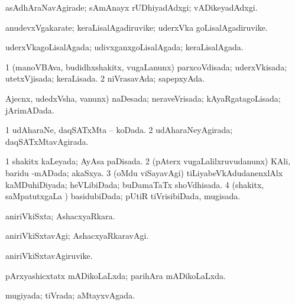 \bentry
{} 
\gl{\kirxvi}
\expl{}
\bmng
 asAdhAraNavAgirade; sAmAnayx rUDhiyadAdxgi; vADikeyadAdxgi. 
\emng
\eentry

\bentry
{} 
\gl{\nA}
\expl{}
\bmng
 anudevxVgakarate; keraLisalAgadiruvike; uderxVka goLisalAgadiruvike. 
\emng
\eentry

\bentry
{} 
\gl{\gu}
\expl{}
\bmng
 uderxVkagoLisalAgada; udivxganxgoLisalAgada; keraLisalAgada. 
\emng
\eentry

\bentry
{} 
\gl{\gu}
\expl{}
\bmng
\bnum
\num{1} (manoVBAva, budidhxshakitx, \mo vugaLanunx) parxcoVdisada; uderxVkisada; utetxVjisada; keraLisada. 
\num{2} niVrasavAda; sapepxyAda. 
\enum
\emng
\eentry

\bentry
{} 
\gl{\gu}
\expl{}
\bmng
 \eng{(} Ajecnx, udedxVsha, \mo vanunx) naDesada; neraveVrisada; kAyaRgatagoLisada; jArimADada. 
\emng
\eentry

\bentry
{} 
\gl{\gu}
\expl{}
\bmng
\bnum
\num{1} udAharaNe, daqSATxMta -- koDada. 
\num{2} udAharaNeyAgirada; daqSATxMtavAgirada. 
\enum
\emng
\eentry

\bentry
{} 
\gl{\gu}
\expl{}
\bmng
\bnum
\num{1} shakitx kaLeyada; AyAsa paDisada. 
\num{2} (pAterx \mo vugaLalilxruvudanunx) KAli, baridu -mADada; akaSxya. 
\num{3} (oMdu viSayavAgi) tiLiyabeVkAdudanenxlAlx kaMDuhiDiyada; heVLibiDada; buDamaTaTx shoVdhisada. 
\num{4} (shakitx, saMpatutxgaLa \vi) basidubiDada; pUtiR tiVrisibiDada, mugisada. 
\enum
\emng
\eentry

\bentry
{} 
\gl{\gu}
\expl{}
\bmng
 aniriVkiSxta; AshacxyaRkara. 
\emng
\eentry

\bentry
{} 
\gl{\kirxvi}
\expl{}
\bmng
 aniriVkiSxtavAgi; AshacxyaRkaravAgi. 
\emng
\eentry

\bentry
{} 
\gl{\nA}
\expl{}
\bmng
 aniriVkiSxtavAgiruvike. 
\emng
\eentry

\bentry
{} 
\gl{\gu}
\expl{}
\bmng
 pArxyashicxtatx mADikoLaLxda; parihAra mADikoLaLxda. 
\emng
\eentry

\bentry
{} 
\gl{\gu}
\expl{}
\bmng
 mugiyada; tiVrada; aMtayxvAgada. 
\emng
\eentry


